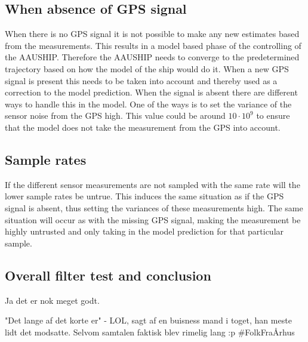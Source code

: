\subsection{When absence of \ac{GPS} signal}
When there is no \ac{GPS} signal it is not possible to make any new estimates based from the measurements. This results in a model based phase of the controlling of the AAUSHIP. Therefore the AAUSHIP needs to converge to the predetermined trajectory based on how the model of the ship would do it. When a new \ac{GPS} signal is present this needs to be taken into account and thereby used as a correction to the model prediction. When the signal is absent there are different ways to handle this in the model. One of the ways is to set the variance of the sensor noise from the \ac{GPS} high. This value could be around $10 \cdot 10^9$ to ensure that the model does not take the measurement from the \ac{GPS} into account.

\subsection{Sample rates}
If the different sensor measurements are not sampled with the same rate will the lower sample rates be untrue. This induces the same situation as if the \ac{GPS} signal is absent, thus setting the variances of these measurements high. The same situation will occur as with the missing \ac{GPS} signal, making the measurement be highly untrusted and only taking in the model prediction for that particular sample.

\subsection{Overall filter test and conclusion}
Ja det er nok meget godt.















"Det lange af det korte er" - LOL, sagt af en buisness mand i toget, han meste lidt det modsatte. Selvom samtalen faktisk blev rimelig lang :p #FolkFraÅrhus